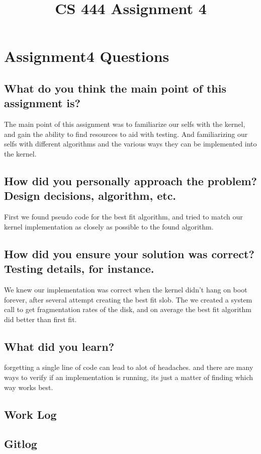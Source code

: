 \documentclass[letterpaper,10pt,titlepage]{IEEEtran}
\author{\name}
\title{CS 444 Assignment 4}
\begin{document}
\maketitle
\hrulefill

\section{Assignment4 Questions}
\subsection{What do you think the main point of this assignment is?}
The main point of this assignment was to familiarize our selfs with the kernel, and gain the ability to find resources to aid with testing. And familiarizing our selfs with different algorithms and the various ways they can be implemented into the kernel.

\subsection{How did you personally approach the problem? Design decisions, algorithm, etc.} 
First we found pseudo code for the best fit algorithm, and tried to match our kernel implementation as closely as possible to the found algorithm.

\subsection{How did you ensure your solution was correct? Testing details, for instance.} 
We knew our implementation was correct when the kernel didn't hang on boot forever, after several attempt creating the best fit slob. The we created a system call to get fragmentation rates of the disk, and on average the best fit algorithm did better than first fit.

\subsection{What did you learn?}
forgetting a single line of code can lead to alot of headaches. and there are many ways to verify if an implementation is running, its just a matter of finding which way works best.

\begin{table*}
\section{Work Log}

\end{table*}

\begin{table*}
\section{Gitlog}

\end{table*}

    
\nocite{*}%



\end{document}
